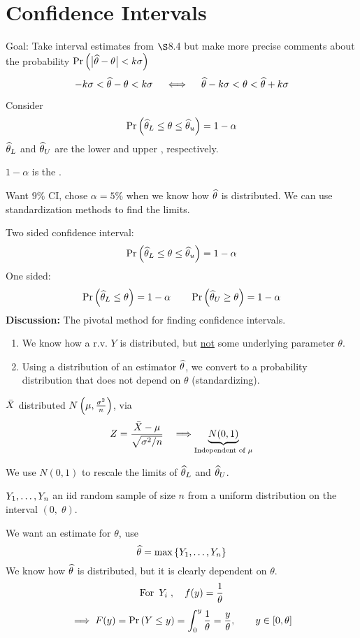 \section{Confidence Intervals}
Goal: Take interval estimates from $\S$8.4 but make more precise comments about the probability $\P{\big| \that - \theta \big| < k\sigma}$
$$-k\sigma < \widehat{\theta}-\theta < k\sigma\quad \iff \quad \widehat{\theta} - k \sigma < \theta < \widehat{\theta} + k\sigma$$

\nl Consider
$$\P{\that_L \leq \theta \leq \that_u} = 1 - \alpha$$
$\widehat{\theta}_L$ and $\widehat{\theta}_U$ are the lower and upper , respectively.

\nl $1-\alpha$ is the .

\example

\nl Want $9\%$ CI, chose $\alpha = 5\%$ when we know how $\widehat{\theta}$ is distributed. We can use standardization methods to find the limits.

\nnl Two sided confidence interval:
$$\P{\that_L \leq \theta \leq \that_u} = 1 - \alpha$$
One sided:
$$\P{\that_L \leq \theta} = 1 - \alpha \qquad \P{\that_U \geq \theta} = 1 - \alpha$$
\textbf{Discussion:} The pivotal method for finding confidence intervals.
\begin{enumerate}[label=\textcircled{\raisebox{-1pt}{\arabic*}}]
    \item We know how a r.v. $Y$ is distributed, but \underline{not} some underlying parameter $\theta$.
    \item Using a distribution of an estimator $\widehat{\theta}$, we convert to a probability distribution that does not depend on $\theta$ (standardizing).
\end{enumerate}

\example

\nl $\bar{X}$ distributed $\normalDist{\mu}{\frac{\sigma^2}{n}}$, via
$$Z = \frac{\bar{X} - \mu}{\sqrt{\sigma^2/n}} \quad \Longrightarrow \underbrace{N(0,1)}_{\text{Independent of $\mu$}}$$

\nl We use $N(0,1)$ to rescale the limits of $\widehat{\theta}_L$ and $\widehat{\theta}_U$.

\example

\nl $Y_1, \dots, Y_n$ an iid random sample of size $n$ from a uniform distribution on the interval $(0,\; \theta)$.

\nnl We want an estimate for $\theta$, use
$$\widehat{\theta} = \operatorname{max}\left\{ Y_1, \dots, Y_n \right\}$$
We know how $\widehat{\theta}$ is distributed, but it is clearly dependent on $\theta$. 
$$\text{For } \, Y_i\;, \quad f(y) = \over{\theta}$$
$$\implies F(y) = \P{Y \leq y} = \int_0^y \over{\theta} = \frac{y}{\theta}, \qquad y \in [0,\theta]$$

